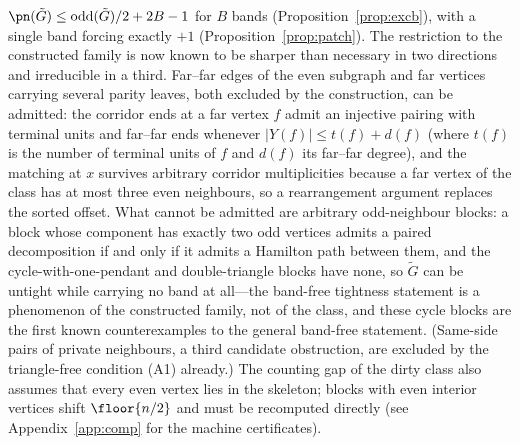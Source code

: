 \begin{remark}
$\pn(\tilde G)\le \mathrm{odd}(\tilde G)/2+2B-1$ for $B$ bands
(Proposition~\ref{prop:excb}), with a single band forcing
exactly $+1$ (Proposition~\ref{prop:patch}). The restriction to the constructed family is now
known to be sharper than necessary in two directions and irreducible in a third. Far--far
edges of the even subgraph and far vertices carrying several parity leaves, both excluded by
the construction, can be admitted: the corridor ends at a far vertex $f$ admit an injective
pairing with terminal units and far--far ends whenever $|Y(f)|\le t(f)+d(f)$ (where $t(f)$ is
the number of terminal units of $f$ and $d(f)$ its far--far degree), and the matching at $x$
survives arbitrary corridor multiplicities because a far vertex of the class has at most
three even neighbours, so a rearrangement argument replaces the sorted offset. What cannot be
admitted are arbitrary odd-neighbour blocks: a block whose component has exactly two odd
vertices admits a paired decomposition if and only if it admits a Hamilton path between them,
and the cycle-with-one-pendant and double-triangle blocks have none, so $\tilde G$ can be
untight while carrying no band at all---the band-free tightness statement is a phenomenon of
the constructed family, not of the class, and these cycle blocks are the first known
counterexamples to the general band-free statement. (Same-side pairs of private neighbours, a
third candidate obstruction, are excluded by the triangle-free condition {\rm(A1)} already.)
The counting gap of the dirty class also assumes that every even vertex lies in the
skeleton; blocks with even interior vertices shift $\floor{n/2}$ and must be recomputed
directly (see Appendix~\ref{app:comp} for the machine certificates).
\end{remark}

